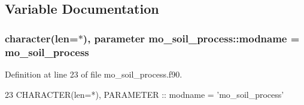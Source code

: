 \subsection{Variable Documentation}
\hypertarget{namespacemo__soil__process_ad7dacf511801f2d14d39a64fe6bfe6d2}{}
\subsubsection[{modname}]{\setlength{\rightskip}{0pt plus 5cm}character(len=$\ast$), parameter mo\+\_\+soil\+\_\+process\+::modname = \textquotesingle{}mo\+\_\+soil\+\_\+process\textquotesingle{}}\label{namespacemo__soil__process_ad7dacf511801f2d14d39a64fe6bfe6d2}


Definition at line 23 of file mo\+\_\+soil\+\_\+process.\+f90.


\begin{DoxyCode}
23   \textcolor{keywordtype}{CHARACTER(len=*)}, \textcolor{keywordtype}{PARAMETER} :: modname = \textcolor{stringliteral}{'mo\_soil\_process'}
\end{DoxyCode}
